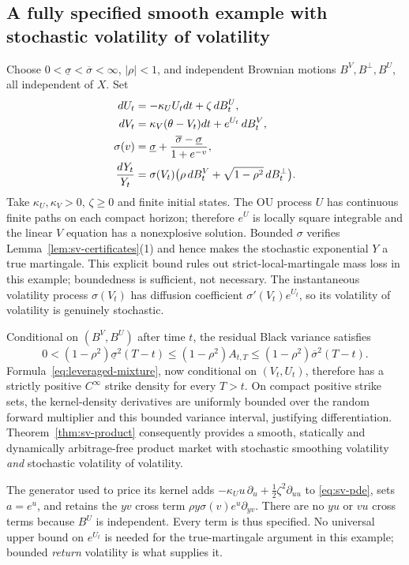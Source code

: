 \documentclass[11pt,a4paper]{article}
\numberwithin{equation}{section}
\theoremstyle{definition}\newtheorem{definition}[theorem]{Definition}
\theoremstyle{remark}\newtheorem{remark}[theorem]{Remark}
\begin{document}
\subsection{A fully specified smooth example with stochastic volatility of volatility}
Choose $0<\underline\sigma<\overline\sigma<\infty$, $|\rho|<1$, and independent Brownian motions $B^V,B^\perp,B^U$, all independent of $X$. Set
\begin{align}
 dU_t&=-\kappa_U U_tdt+\zeta\,dB_t^U,\notag\\
 dV_t&=\kappa_V(\theta-V_t)dt+e^{U_t}\,dB_t^V,\notag\\
 \sigma(v)&=\underline\sigma+
          \frac{\overline\sigma-\underline\sigma}{1+e^{-v}},\notag\\
 \frac{dY_t}{Y_t}&=\sigma(V_t)
       \bigl(\rho\,dB_t^V+\sqrt{1-\rho^2}\,dB_t^\perp\bigr).
 \label{eq:explicit-sv-example}
\end{align}
Take $\kappa_U,\kappa_V>0$, $\zeta\geq0$ and finite initial states. The OU process $U$ has continuous finite paths on each compact horizon; therefore $e^U$ is locally square integrable and the linear $V$ equation has a nonexplosive solution. Bounded $\sigma$ verifies Lemma~\ref{lem:sv-certificates}(1) and hence makes the stochastic exponential $Y$ a true martingale. This explicit bound rules out strict-local-martingale mass loss in this example; boundedness is sufficient, not necessary. The instantaneous volatility process $\sigma(V_t)$ has diffusion coefficient $\sigma'(V_t)e^{U_t}$, so its volatility of volatility is genuinely stochastic.

Conditional on $(B^V,B^U)$ after time $t$, the residual Black variance satisfies
\[
 0<(1-\rho^2)\underline\sigma^2(T-t)
 \leq(1-\rho^2)A_{t,T}
 \leq(1-\rho^2)\overline\sigma^2(T-t).
\]
Formula~\eqref{eq:leveraged-mixture}, now conditional on $(V_t,U_t)$, therefore has a strictly positive $C^\infty$ strike density for every $T>t$. On compact positive strike sets, the kernel-density derivatives are uniformly bounded over the random forward multiplier and this bounded variance interval, justifying differentiation. Theorem~\ref{thm:sv-product} consequently provides a smooth, statically and dynamically arbitrage-free product market with stochastic smoothing volatility \emph{and} stochastic volatility of volatility.

The generator used to price its kernel adds $-\kappa_Uu\,\partial_u+\tfrac12\zeta^2\partial_{uu}$ to \eqref{eq:sv-pde}, sets $a=e^u$, and retains the $yv$ cross term $\rho y\sigma(v)e^u\partial_{yv}$. There are no $yu$ or $vu$ cross terms because $B^U$ is independent. Every term is thus specified. No universal upper bound on $e^{U_t}$ is needed for the true-martingale argument in this example; bounded \emph{return} volatility is what supplies it.
\end{document}
